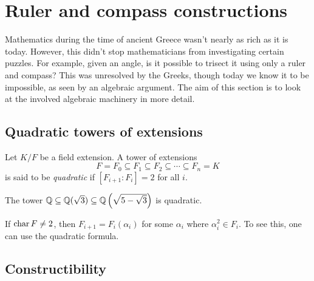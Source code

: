 \chapter{Ruler and compass constructions}

Mathematics during the time of ancient Greece wasn't nearly as rich as it is today. However, this didn't stop mathematicians from investigating certain puzzles. For example, given an angle, is it possible to trisect it using only a ruler and compass? This was unresolved by the Greeks, though today we know it to be impossible, as seen by an algebraic argument. The aim of this section is to look at the involved algebraic machinery in more detail.

\section{Quadratic towers of extensions}

\begin{definition}
    Let $K/F$ be a field extension. A tower of extensions
    \[
        F = F_0 \subseteq F_1 \subseteq F_2 \subseteq \cdots \subseteq F_n = K
    \]
    is said to be \emph{quadratic} if $[F_{i + 1} : F_i] = 2$ for all $i$.
\end{definition}

\begin{example}
    The tower $\mathbb{{Q}} \subseteq \mathbb{{Q}}(\sqrt{3}) \subseteq \mathbb{{Q}}\left(\sqrt{5 - \sqrt{3}}\right)$ is quadratic.
\end{example}

\begin{remark}
    If $\operatorname{char}{{F}} \neq 2$, then $F_{i + 1} = F_i(\alpha_i)$ for some $\alpha_i$ where $\alpha_i^2 \in F_i$. To see this, one can use the quadratic formula.
\end{remark}

\section{Constructibility}

